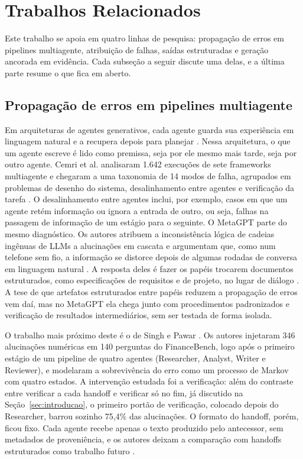 \section{Trabalhos Relacionados}\label{sec:trabalhos}

Este trabalho se apoia em quatro linhas de pesquisa: propagação de erros em pipelines multiagente, atribuição de falhas, saídas estruturadas e geração ancorada em evidência.
Cada subseção a seguir discute uma delas, e a última parte resume o que fica em aberto.

\subsection{Propagação de erros em pipelines multiagente}\label{sec:rel-propagacao}

Em arquiteturas de agentes generativos, cada agente guarda sua experiência em linguagem natural e a recupera depois para planejar \cite{park2023generative}.
Nessa arquitetura, o que um agente escreve é lido como premissa, seja por ele mesmo mais tarde, seja por outro agente.
Cemri et al. analisaram 1.642 execuções de sete frameworks multiagente e chegaram a uma taxonomia de 14 modos de falha, agrupados em problemas de desenho do sistema, desalinhamento entre agentes e verificação da tarefa \cite{cemri2025why}.
O desalinhamento entre agentes inclui, por exemplo, casos em que um agente retém informação ou ignora a entrada de outro, ou seja, falhas na passagem de informação de um estágio para o seguinte.
O MetaGPT parte do mesmo diagnóstico. Os autores atribuem a inconsistência lógica de cadeias ingênuas de LLMs a alucinações em cascata e argumentam que, como num telefone sem fio, a informação se distorce depois de algumas rodadas de conversa em linguagem natural \cite{hong2023metagpt}.
A resposta deles é fazer os papéis trocarem documentos estruturados, como especificações de requisitos e de projeto, no lugar de diálogo \cite{hong2023metagpt}.
A tese de que artefatos estruturados entre papéis reduzem a propagação de erros vem daí, mas no MetaGPT ela chega junto com procedimentos padronizados e verificação de resultados intermediários, sem ser testada de forma isolada.

O trabalho mais próximo deste é o de Singh e Pawar \cite{singh2026snowball}.
Os autores injetaram 346 alucinações numéricas em 140 perguntas do FinanceBench, logo após o primeiro estágio de um pipeline de quatro agentes (Researcher, Analyst, Writer e Reviewer), e modelaram a sobrevivência do erro como um processo de Markov com quatro estados.
A intervenção estudada foi a verificação: além do contraste entre verificar a cada handoff e verificar só no fim, já discutido na Seção~\ref{sec:introducao}, o primeiro portão de verificação, colocado depois do Researcher, barrou sozinho 75,4\% das alucinações.
O formato do handoff, porém, ficou fixo. Cada agente recebe apenas o texto produzido pelo antecessor, sem metadados de proveniência, e os autores deixam a comparação com handoffs estruturados como trabalho futuro \cite{singh2026snowball}.

